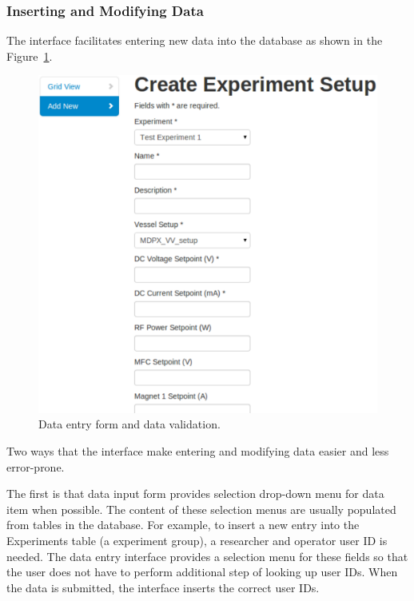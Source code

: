 \subsubsection{Inserting and Modifying Data}

The interface facilitates entering new data into the database as shown in the Figure~\ref{fig:create_exp_setup}.

\begin{figure}[h]
\centering
\includegraphics[width=6in]{create_experiment_setup.pdf}
\caption{Data entry form and data validation.\label{fig:create_exp_setup}}
\end{figure}

Two ways that the interface make entering and modifying data easier and less error-prone.

The first is that data input form provides selection drop-down menu for data item when possible. The content of these selection menus are usually populated from tables in the database. For example, to insert a new entry into the Experiments table (a experiment group), a researcher and operator user ID is needed. The data entry interface provides a selection menu for these fields so that the user does not have to perform additional step of looking up user IDs. When the data is submitted, the interface inserts the correct user IDs.

